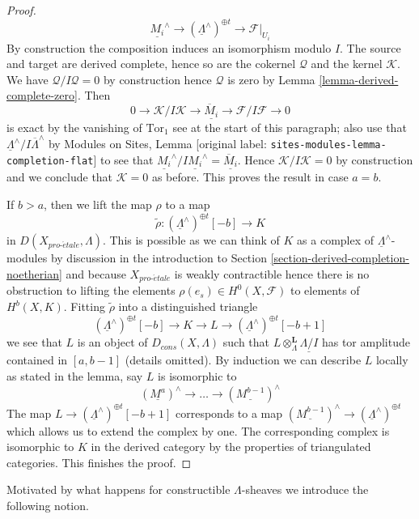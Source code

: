 \documentclass[10pt,a4paper]{article}
\theoremstyle{plain}
\theoremstyle{definition}
\theoremstyle{remark}
\numberwithin{equation}{subsection}
\def\proetale{{pro\text{-}\acute{e}tale}}
\begin{document}
\begin{proof}
$$\underline{M_i}^\wedge \to
(\underline{\Lambda}^\wedge)^{\oplus t} \to
\mathcal{F}|_{U_i}
$$
By construction the composition induces an isomorphism modulo $I$.
The source and target are derived complete, hence so are the cokernel
$\mathcal{Q}$ and the kernel $\mathcal{K}$. We have
$\mathcal{Q}/I\mathcal{Q} = 0$ by construction hence $\mathcal{Q}$
is zero by Lemma \ref{lemma-derived-complete-zero}.
Then
$$
0 \to \mathcal{K}/I\mathcal{K} \to
\underline{\overline{M}_i}
\to \mathcal{F}/I\mathcal{F} \to 0
$$
is exact by the vanishing of $\text{Tor}_1$ see at the start of this
paragraph; also use that
$\underline{\Lambda}^\wedge/I\overline{\Lambda}^\wedge$ by
Modules on Sites, Lemma [original label: \nolinkurl{sites-modules-lemma-completion-flat}]
to see that
$\underline{M_i}^\wedge/I\underline{M_i}^\wedge = \underline{\overline{M}_i}$.
Hence $\mathcal{K}/I\mathcal{K} = 0$ by construction and we conclude
that $\mathcal{K} = 0$ as before. This proves the result in case $a = b$.

\medskip\noindent
If $b > a$, then we lift the map $\rho$ to a map
$$
\tilde \rho : (\underline{\Lambda}^\wedge)^{\oplus t}[-b] \longrightarrow K
$$
in $D(X_\proetale, \Lambda)$. This is possible as we can think of
$K$ as a complex of $\underline{\Lambda}^\wedge$-modules by
discussion in the introduction to
Section \ref{section-derived-completion-noetherian}
and because $X_\proetale$ is weakly contractible
hence there is no obstruction to lifting the elements
$\rho(e_s) \in H^0(X, \mathcal{F})$ to elements of $H^b(X, K)$.
Fitting $\tilde \rho$ into a distinguished triangle
$$
(\underline{\Lambda}^\wedge)^{\oplus t}[-b] \to K \to L \to
(\underline{\Lambda}^\wedge)^{\oplus t}[-b + 1]
$$
we see that $L$ is an object of $D_{cons}(X, \Lambda)$ such
that $L \otimes_\Lambda^\mathbf{L} \underline{\Lambda/I}$
has tor amplitude contained in $[a, b - 1]$ (details omitted).
By induction we can describe $L$ locally as stated in the lemma, say
$L$ is isomorphic to
$$
(\underline{M^a})^\wedge \to \ldots \to (\underline{M^{b - 1}})^\wedge
$$
The map
$L \to (\underline{\Lambda}^\wedge)^{\oplus t}[-b + 1]$
corresponds to a map
$(\underline{M^{b - 1}})^\wedge \to (\underline{\Lambda}^\wedge)^{\oplus t}$
which allows us to extend the complex by one. The corresponding
complex is isomorphic to $K$ in the derived category by the properties
of triangulated categories. This finishes the proof.
\end{proof}

\noindent
Motivated by what happens for constructible $\Lambda$-sheaves
we introduce the following notion.
\end{document}
